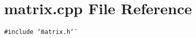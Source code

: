 \section{matrix.cpp File Reference}
\label{matrix_8cpp}
{\tt \#include \char`\"{}matrix.h\char`\"{}}\par

